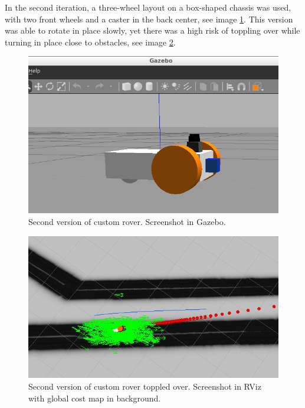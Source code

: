 \documentclass[10pt,journal,compsoc]{IEEEtran}
\begin{document}
In the second iteration, a three-wheel layout on a box-shaped chassis was used, with two front wheels and a caster in the back center, see image \ref{fig:rover_2_design}. This version was able to rotate in place slowly, yet there was a high risk of toppling over while turning in place close to obstacles, see image \ref{fig:rover_2_toppled}.
\begin{figure}[thpb]
      \centering
      \includegraphics[width=\columnwidth]{images/rover_version_2_gazebo.png}
      \caption{Second version of custom rover. Screenshot in Gazebo.}
      \label{fig:rover_2_design}
\end{figure}
\begin{figure}[thpb]
      \centering
      \includegraphics[width=\columnwidth]{images/rover_version_2_toppled_rviz.png}
      \caption{Second version of custom rover toppled over. Screenshot in RViz with global cost map in background.}
      \label{fig:rover_2_toppled}
\end{figure}
\end{document}
